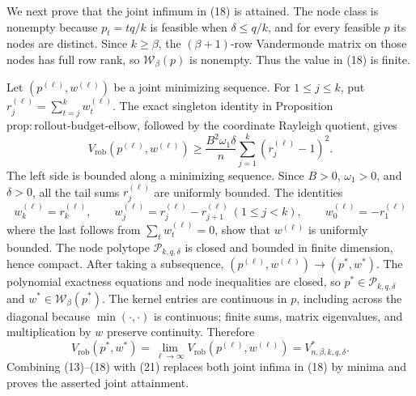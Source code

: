 We next prove that the joint infimum in (18) is attained.  The node class is nonempty because \(p_t=tq/k\) is feasible when \(\delta\le q/k\), and for every feasible \(p\) its nodes are distinct.  Since \(k\ge\beta\), the \((\beta+1)\)-row Vandermonde matrix on those nodes has full row rank, so \(\mathcal W_\beta(p)\) is nonempty.  Thus the value in (18) is finite.

Let \((p^{(\ell)},w^{(\ell)})\) be a joint minimizing sequence.  For \(1\le j\le k\), put \(r_j^{(\ell)}=\sum_{t=j}^kw_t^{(\ell)}\).  The exact singleton identity in Proposition~\(\mathrm{prop{:}rollout\text{-}budget\text{-}elbow}\), followed by the coordinate Rayleigh quotient, gives
\[
V_{\mathrm{rob}}(p^{(\ell)},w^{(\ell)})
\ge \frac{B^2\omega_1\delta}{n}
\sum_{j=1}^k(r_j^{(\ell)}-1)^2.
\tag{19}
\]
The left side is bounded along a minimizing sequence.  Since \(B>0\), \(\omega_1>0\), and \(\delta>0\), all the tail sums \(r_j^{(\ell)}\) are uniformly bounded.  The identities
\[
w_k^{(\ell)}=r_k^{(\ell)},
\qquad
w_j^{(\ell)}=r_j^{(\ell)}-r_{j+1}^{(\ell)}\ (1\le j<k),
\qquad
w_0^{(\ell)}=-r_1^{(\ell)}
\tag{20}
\]
where the last follows from \(\sum_tw_t^{(\ell)}=0\), show that \(w^{(\ell)}\) is uniformly bounded.  The node polytope \(\mathcal P_{k,q,\delta}\) is closed and bounded in finite dimension, hence compact.  After taking a subsequence, \((p^{(\ell)},w^{(\ell)})\to(p^*,w^*)\).  The polynomial exactness equations and node inequalities are closed, so \(p^*\in\mathcal P_{k,q,\delta}\) and \(w^*\in\mathcal W_\beta(p^*)\).  The kernel entries are continuous in \(p\), including across the diagonal because \(\min(\cdot,\cdot)\) is continuous; finite sums, matrix eigenvalues, and multiplication by \(w\) preserve continuity.  Therefore
\[
V_{\mathrm{rob}}(p^*,w^*)
=\lim_{\ell\to\infty}V_{\mathrm{rob}}(p^{(\ell)},w^{(\ell)})
=V^*_{n,\beta,k,q,\delta}.
\tag{21}
\]
Combining (13)--(18) with (21) replaces both joint infima in (18) by minima and proves the asserted joint attainment.

